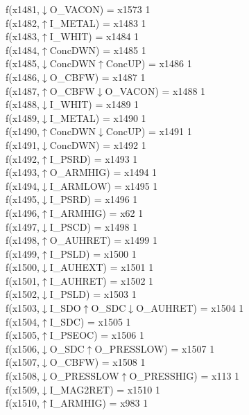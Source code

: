f(x1481,$\downarrow$O\_VACON) = x1573 {1} \\
f(x1482,$\uparrow$I\_METAL) = x1483 {1} \\
f(x1483,$\uparrow$I\_WHIT) = x1484 {1} \\
f(x1484,$\uparrow$ConcDWN) = x1485 {1} \\
f(x1485,$\downarrow$ConcDWN$\uparrow$ConcUP) = x1486 {1} \\
f(x1486,$\downarrow$O\_CBFW) = x1487 {1} \\
f(x1487,$\uparrow$O\_CBFW$\downarrow$O\_VACON) = x1488 {1} \\
f(x1488,$\downarrow$I\_WHIT) = x1489 {1} \\
f(x1489,$\downarrow$I\_METAL) = x1490 {1} \\
f(x1490,$\uparrow$ConcDWN$\downarrow$ConcUP) = x1491 {1} \\
f(x1491,$\downarrow$ConcDWN) = x1492 {1} \\
f(x1492,$\uparrow$I\_PSRD) = x1493 {1} \\
f(x1493,$\uparrow$O\_ARMHIG) = x1494 {1} \\
f(x1494,$\downarrow$I\_ARMLOW) = x1495 {1} \\
f(x1495,$\downarrow$I\_PSRD) = x1496 {1} \\
f(x1496,$\uparrow$I\_ARMHIG) = x62 {1} \\
f(x1497,$\downarrow$I\_PSCD) = x1498 {1} \\
f(x1498,$\uparrow$O\_AUHRET) = x1499 {1} \\
f(x1499,$\uparrow$I\_PSLD) = x1500 {1} \\
f(x1500,$\downarrow$I\_AUHEXT) = x1501 {1} \\
f(x1501,$\uparrow$I\_AUHRET) = x1502 {1} \\
f(x1502,$\downarrow$I\_PSLD) = x1503 {1} \\
f(x1503,$\downarrow$I\_SDO$\uparrow$O\_SDC$\downarrow$O\_AUHRET) = x1504 {1} \\
f(x1504,$\uparrow$I\_SDC) = x1505 {1} \\
f(x1505,$\uparrow$I\_PSEOC) = x1506 {1} \\
f(x1506,$\downarrow$O\_SDC$\uparrow$O\_PRESSLOW) = x1507 {1} \\
f(x1507,$\downarrow$O\_CBFW) = x1508 {1} \\
f(x1508,$\downarrow$O\_PRESSLOW$\uparrow$O\_PRESSHIG) = x113 {1} \\
f(x1509,$\downarrow$I\_MAG2RET) = x1510 {1} \\
f(x1510,$\uparrow$I\_ARMHIG) = x983 {1} \\
